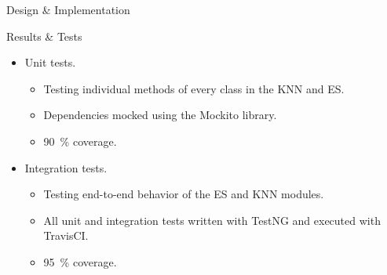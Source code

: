\documentclass[final]{beamer} %
\begin{document}
\begin{frame}
\begin{columns}
\begin{column}{.34\textwidth}
{\begin{block}{Design \& Implementation}
					
				\end{block}
				\begin{block}{Results \& Tests}
					\begin{itemize}
						\item Unit tests.
						\begin{itemize}
							\item Testing individual methods of every class in the KNN and ES.
							\item Dependencies mocked using the Mockito library.
							\item \SI{90}{\percent} coverage.
						\end{itemize}
					\end{itemize}
					
					\begin{itemize}
						\item Integration tests.
						\begin{itemize}
							\item Testing end-to-end behavior of the ES and KNN modules.
							\item All unit and integration tests written with TestNG and executed with TravisCI.
							\item \SI{95}{\percent} coverage.
						\end{itemize}
					\end{itemize}
				

\end{block}}
\end{column}
\end{columns}
\end{frame}
\end{document}
